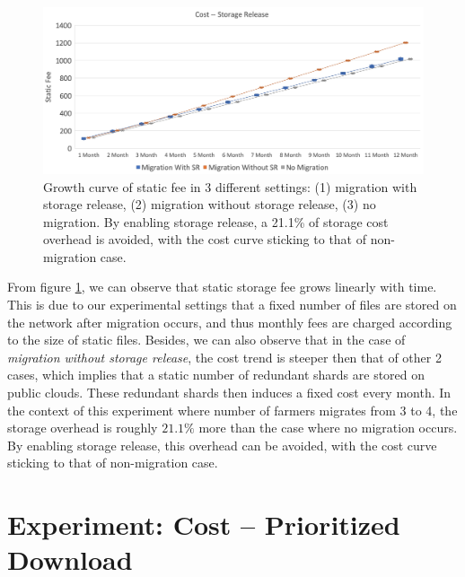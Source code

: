 \begin{figure}[hbt]
  \centering
    \includegraphics[width=14cm]{charts/chart_cost_storage_release.png}
    \caption[Growth curve of static fee in 3 different settings: (1) migration with storage release, (2) migration without storage release, (3) no migration]{Growth curve of static fee in 3 different settings: (1) migration with storage release, (2) migration without storage release, (3) no migration. By enabling storage release, a 21.1\% of storage cost overhead is avoided, with the cost curve sticking to that of non-migration case.}
    \label{fig:coststoragerelease}
\end{figure}

From figure \ref{fig:coststoragerelease}, we can observe that static storage fee grows linearly with time. This is due to our experimental settings that a fixed number of files are stored on the network after migration occurs, and thus monthly fees are charged according to the size of static files. Besides, we can also observe that in the case of \textit{migration without storage release}, the cost trend is steeper then that of other 2 cases, which implies that a static number of redundant shards are stored on public clouds. These redundant shards then induces a fixed cost every month. In the context of this experiment where number of farmers migrates from 3 to 4, the storage overhead is roughly $21.1\%$ more than the case where no migration occurs. By enabling storage release, this overhead can be avoided, with the cost curve sticking to that of non-migration case.

\section{Experiment: Cost -- Prioritized Download}
\label{s:expcostprioritizeddownload}

